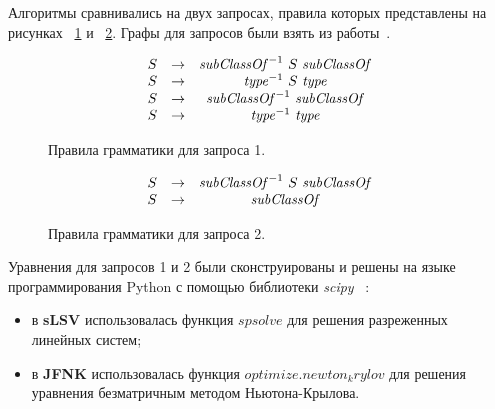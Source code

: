 \documentclass[12pt]{matmex-diploma-custom}
\begin{document}
Алгоритмы сравнивались на двух запросах, правила которых представлены на рисунках ~\ref{ProductionRulesQuery1} и ~\ref{ProductionRulesQuery2}. Графы для запросов были взять из работы~\cite{RDF}.

\begin{figure}[h]
   \[
\begin{array}{rccl}
   S & \rightarrow & \text{\emph{subClassOf}}^{-1} \ S \ \text{\emph{subClassOf}} \\ 
   S & \rightarrow & \text{\emph{type}}^{-1} \ S \ \text{\emph{type}} \\ 
   S & \rightarrow & \text{\emph{subClassOf}}^{-1} \ \text{\emph{subClassOf}} \\ 
   S & \rightarrow & \text{\emph{type}}^{-1} \ \text{\emph{type}} \\ 
\end{array}
\]
\caption{Правила грамматики для запроса 1.}
\label{ProductionRulesQuery1}
\end{figure}


\begin{figure}[h]
   \[
\begin{array}{rccl}
   S & \rightarrow & \text{\emph{subClassOf}}^{-1} \ S \ \text{\emph{subClassOf}} \\ 
   S & \rightarrow & \text{\emph{subClassOf}} \\
\end{array}
\]
\caption{Правила грамматики для запроса 2.}
\label{ProductionRulesQuery2}
\end{figure}

Уравнения для запросов 1 и 2 были сконструированы и решены на языке программирования Python с помощью библиотеки \textit{scipy} ~\cite{scipy}:
    \begin{itemize}
        \item в \textbf{sLSV} использовалась функция $spsolve$ для решения разреженных линейных систем;
        \item в \textbf{JFNK} использовалась функция $optimize.newton_krylov$ для решения уравнения безматричным методом Ньютона-Крылова.
    \end{itemize}
\end{document}
